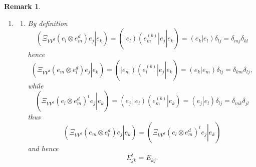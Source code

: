\documentclass[aps,preprint]{revtex4}%
\newtheorem{remark}[theorem]{Remark}
\begin{document}
\begin{remark}
\begin{enumerate}
\item
\begin{enumerate}
\item By definition
\begin{equation}
\left(  \left.  \overset{}{\Xi_{VV^{d}}\left(  e_{l}\otimes e_{m}^{d}\right)
}e_{j}\right\vert e_{k}\right)  =\left(  \left.  \overset{}{\left\vert
e_{l}\right)  \left(  e_{m}^{\left(  b\right)  }\right\vert }e_{j}\right\vert
e_{k}\right)  =\left(  \left.  \overset{}{e_{k}}\right\vert e_{l}\right)
\delta_{lj}=\delta_{mj}\delta_{kl}%
\end{equation}
hence
\begin{equation}
\left(  \left.  \overset{}{\Xi_{VV^{d}}\left(  e_{m}\otimes e_{l}^{d}\right)
}e_{j}\right\vert e_{k}\right)  =\left(  \left.  \overset{}{\left\vert
e_{m}\right)  \left(  e_{l}^{\left(  b\right)  }\right\vert }e_{j}\right\vert
e_{k}\right)  =\left(  \left.  \overset{}{e_{k}}\right\vert e_{m}\right)
\delta_{lj}=\delta_{km}\delta_{lj},
\end{equation}
while
\begin{equation}
\left(  \left.  \overset{}{\Xi_{VV^{d}}\left(  e_{l}\otimes e_{m}^{d}\right)
^{t}}e_{j}\right\vert e_{k}\right)  =\left(  \left.  \overset{\overset{}{}%
}{e_{j}}\right\vert \left\vert e_{l}\right)  \left(  e_{m}^{\left(  b\right)
}\right\vert e_{k}\right)  =\left(  \left.  \overset{}{e_{j}}\right\vert
e_{l}\right)  \delta_{lj}=\delta_{mk}\delta_{jl}%
\end{equation}
thus
\begin{equation}
\left(  \left.  \overset{}{\Xi_{VV^{d}}\left(  e_{m}\otimes e_{l}^{d}\right)
}e_{j}\right\vert e_{k}\right)  =\left(  \left.  \overset{}{\Xi_{VV^{d}%
}\left(  e_{l}\otimes e_{m}^{d}\right)  ^{t}}e_{j}\right\vert e_{k}\right)
\end{equation}
and hence
\begin{equation}
E_{jk}^{t}=E_{kj}.
\end{equation}



\end{enumerate}
\end{enumerate}
\end{remark}
\end{document}
